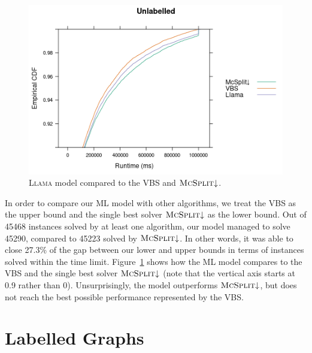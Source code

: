 \documentclass{l4proj}
\theoremstyle{definition}
\theoremstyle{remark}
\begin{document}
\begin{figure}
  \centering
  \includegraphics[scale=0.5]{images/ecdf_unlabelled_llama.png}
  \caption{\textsc{Llama} model compared to the VBS and
    $\textsc{McSplit}{\downarrow}$.}
  \label{fig:ecdf_unlabelled_llama}
\end{figure}

In order to compare our ML model with other algorithms, we treat the VBS as the
upper bound and the single best solver $\textsc{McSplit}{\downarrow}$ as the
lower bound. Out of \num{45468} instances solved by at least one algorithm, our
model managed to solve \num{45290}, compared to \num{45223} solved by
$\textsc{McSplit}{\downarrow}$. In other words, it was able to close 27.3\% of
the gap between our lower and upper bounds in terms of instances solved within
the time limit. Figure~\ref{fig:ecdf_unlabelled_llama} shows how the ML model
compares to the VBS and the single best solver $\textsc{McSplit}{\downarrow}$
(note that the vertical axis starts at 0.9 rather than 0). Unsurprisingly, the
model outperforms $\textsc{McSplit}{\downarrow}$, but does not reach the best
possible performance represented by the VBS.

\section{Labelled Graphs} \label{sec:ml_labelled}
\end{document}
